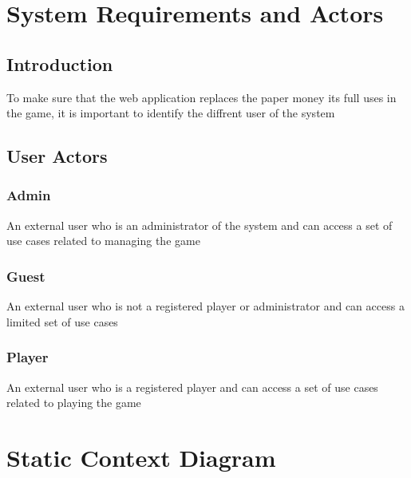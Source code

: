 \documentclass{article}
\begin{document}
\section {System Requirements and Actors}
\subsection {Introduction}
To make sure that the web application replaces the paper money its full uses in the game, it is important to identify the diffrent user of the system

\subsection {User Actors}
\subsubsection {Admin}
 An external user who is an administrator of the system and can access a set of use cases related to managing the game
\subsubsection {Guest}
An external user who is not a registered player or administrator and can access a limited set of use cases
\subsubsection {Player}
 An external user who is a registered player and can access a set of use cases related to playing the game
 \section{Static Context Diagram}
\end{document}
